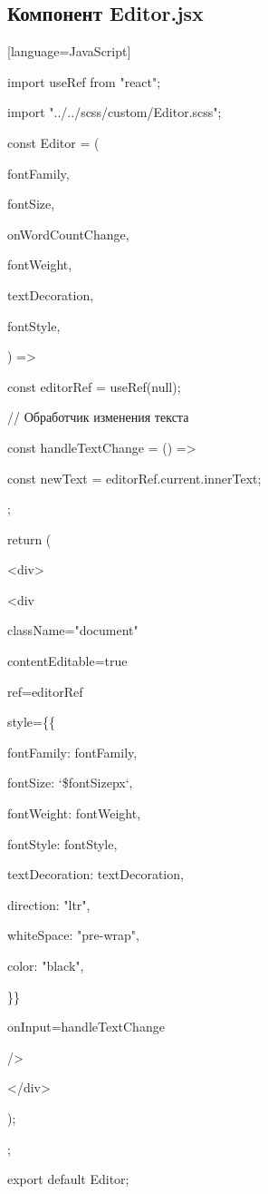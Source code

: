 \documentclass[a4paper,12pt]{article}
\begin{document}
\subsection*{Компонент Editor.jsx}
[language=JavaScript]

\begin{description}

\item import { useRef } from "react";
\item import "../../scss/custom/Editor.scss";

\item const Editor = ({
  \item fontFamily,
  \item fontSize,
  \item onWordCountChange,
  \item fontWeight,
  \item textDecoration,
  \item fontStyle,
\item }) => {
  \item const editorRef = useRef(null);

  \item // Обработчик изменения текста
  \item const handleTextChange = () => {
    \item const newText = editorRef.current.innerText;
  
  \item };

  \item return (
    \item <div>
      \item <div
        \item className="document"
        \item contentEditable={true}
        \item ref={editorRef}
        \item style=\{\{
          \item fontFamily: fontFamily,
          \item fontSize: `\${fontSize}px`,
          \item fontWeight: fontWeight,
          \item fontStyle: fontStyle,
          \item textDecoration: textDecoration,
          \item direction: "ltr",
          \item whiteSpace: "pre-wrap",
          \item color: "black",
        \item \}\}
        \item onInput={handleTextChange}
      \item />
    \item </div>
  \item );
\item };

export default Editor;
\end{description}
\end{document}
